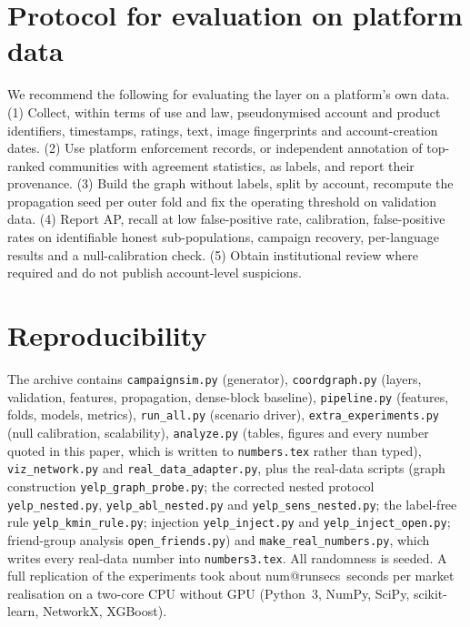 \documentclass[pdflatex,sn-basic]{sn-jnl}
\makeatletter
\theoremstyle{thmstyleone}
\theoremstyle{thmstylethree}
\newcommand{\num}[1]{\csname num@#1\endcsname}
\makeatother
\begin{document}
\begin{appendices}

\section{Protocol for evaluation on platform data}\label{app:real}
We recommend the following for evaluating the layer on a platform's own data. (1) Collect, within terms of use and law, pseudonymised account and product identifiers, timestamps, ratings, text, image fingerprints and account-creation dates. (2) Use platform enforcement records, or independent annotation of top-ranked communities with agreement statistics, as labels, and report their provenance. (3) Build the graph without labels, split by account, recompute the propagation seed per outer fold and fix the operating threshold on validation data. (4) Report AP, recall at low false-positive rate, calibration, false-positive rates on identifiable honest sub-populations, campaign recovery, per-language results and a null-calibration check. (5) Obtain institutional review where required and do not publish account-level suspicions.

\section{Reproducibility}\label{app:repro}
The archive contains \texttt{campaignsim.py} (generator), \texttt{coordgraph.py} (layers, validation, features, propagation, dense-block baseline), \texttt{pipeline.py} (features, folds, models, metrics), \texttt{run\_all.py} (scenario driver), \texttt{extra\_experiments.py} (null calibration, scalability), \texttt{analyze.py} (tables, figures and every number quoted in this paper, which is written to \texttt{numbers.tex} rather than typed), \texttt{viz\_network.py} and \texttt{real\_data\_adapter.py}, plus the real-data scripts (graph construction \texttt{yelp\_graph\_probe.py}; the corrected nested protocol \texttt{yelp\_nested.py}, \texttt{yelp\_abl\_nested.py} and \texttt{yelp\_sens\_nested.py}; the label-free rule \texttt{yelp\_kmin\_rule.py}; injection \texttt{yelp\_inject.py} and \texttt{yelp\_inject\_open.py}; friend-group analysis \texttt{open\_friends.py}) and \texttt{make\_real\_numbers.py}, which writes every real-data number into \texttt{numbers3.tex}. All randomness is seeded. A full replication of the experiments took about \num{runsecs}~seconds per market realisation on a two-core CPU without GPU (Python~3, NumPy, SciPy, scikit-learn, NetworkX, XGBoost).

\end{appendices}


\end{document}
